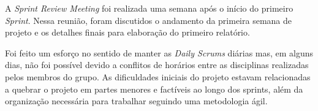 \par A \textit{Sprint Review Meeting} foi realizada uma semana após o início do primeiro \textit{Sprint}. Nessa reunião, foram discutidos o andamento da primeira semana de projeto e os detalhes finais para elaboração do primeiro relatório.
\newline
\par Foi feito um esforço no sentido de manter as \textit{Daily Scrums} diárias mas, em alguns dias, não foi possível devido a conflitos de horários entre as disciplinas realizadas pelos membros do grupo. As dificuldades iniciais do projeto estavam relacionadas a quebrar o projeto em partes menores e factíveis ao longo dos sprints, além da organização necessária para trabalhar seguindo uma metodologia ágil.
